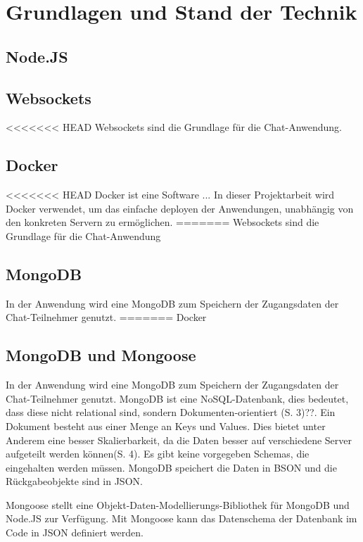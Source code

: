 
\chapter{Grundlagen und Stand der Technik}\label{cha:Grundlagen}
\section{Node.JS}\label{sec:Node.JS}

\section{Websockets}\label{sec:Websockets}
<<<<<<< HEAD
Websockets sind die Grundlage für die Chat-Anwendung.
\section{Docker}\label{sec:Docker}
<<<<<<< HEAD
Docker ist eine Software ... In dieser Projektarbeit wird Docker verwendet, um das einfache deployen der Anwendungen, unabhängig von den konkreten Servern zu ermöglichen.
=======
Websockets sind die Grundlage für die Chat-Anwendung

\section{MongoDB}\label{sec:MongoDB}
In der Anwendung wird eine MongoDB zum Speichern der Zugangsdaten der Chat-Teilnehmer genutzt.
=======
Docker 
\section{MongoDB und Mongoose}\label{sec:MongoDB}
In der Anwendung wird eine MongoDB zum Speichern der Zugangsdaten der Chat-Teilnehmer genutzt.
MongoDB ist eine NoSQL-Datenbank, dies bedeutet, dass diese nicht relational sind, sondern Dokumenten-orientiert (S. 3)??. Ein Dokument besteht aus einer Menge an Keys und Values.
Dies bietet unter Anderem eine besser Skalierbarkeit, da die Daten besser auf verschiedene Server aufgeteilt werden können(S. 4). Es gibt keine vorgegeben Schemas, die eingehalten werden müssen. MongoDB speichert die Daten in BSON und die Rückgabeobjekte sind in JSON.


Mongoose stellt eine Objekt-Daten-Modellierungs-Bibliothek für MongoDB und Node.JS zur Verfügung.
Mit Mongoose kann das Datenschema der Datenbank im Code in JSON definiert werden.

